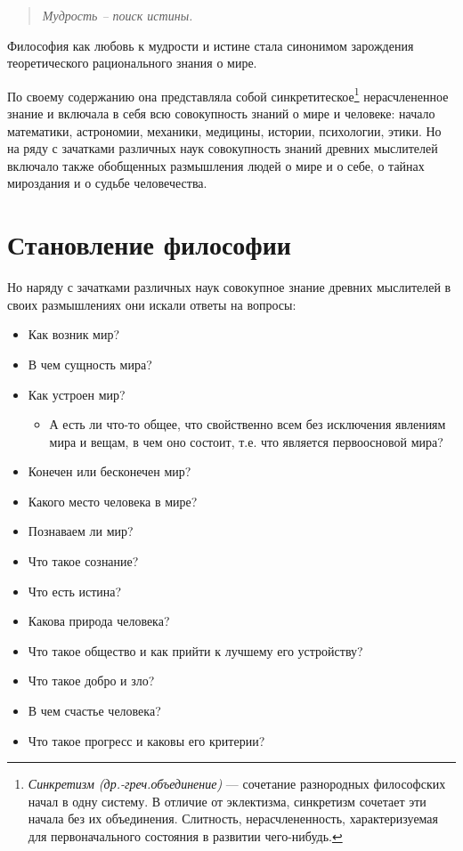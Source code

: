 \documentclass[a4paper, 14pt]{extreport}
\begin{document}
\begin{quote}
\emph{Мудрость -- поиск истины.}
\end{quote}

Философия как любовь к мудрости и истине стала синонимом зарождения
теоретического рационального знания о мире.

По своему содержанию она представляла собой синкретитеское\footnote{
\emph{Синкретизм (др.-греч.объединение)} ---
  сочетание разнородных философских начал в одну систему. В отличие от
  эклектизма, синкретизм сочетает эти начала без их объединения.
  Слитность, нерасчлененность, характеризуемая для первоначального
  состояния в развитии чего-нибудь.
  } нерасчлененное знание и включала в себя всю
совокупность знаний о мире и человеке: начало математики, астрономии,
механики, медицины, истории, психологии, этики. Но на ряду с зачатками
различных наук совокупность знаний древних мыслителей включало также
обобщенных размышления людей о мире и о себе, о тайнах мироздания и о
судьбе человечества.

\section{Становление философии}

Но наряду с зачатками различных наук совокупное знание древних
мыслителей в своих размышлениях они искали ответы на вопросы:

\begin{itemize}

\item
  Как возник мир?
\item
  В чем сущность мира?
\item
  Как устроен мир?

  \begin{itemize}
  
  \item
    А есть ли что-то общее, что свойственно всем без исключения явлениям
    мира и вещам, в чем оно состоит, т.е. что является первоосновой
    мира?
  \end{itemize}
\item
  Конечен или бесконечен мир?
\item
  Какого место человека в мире?
\item
  Познаваем ли мир?
\item
  Что такое сознание?
\item
  Что есть истина?
\item
  Какова природа человека?
\item
  Что такое общество и как прийти к лучшему его устройству?
\item
  Что такое добро и зло?
\item
  В чем счастье человека?
\item
  Что такое прогресс и каковы его критерии?
\end{itemize}
\end{document}
